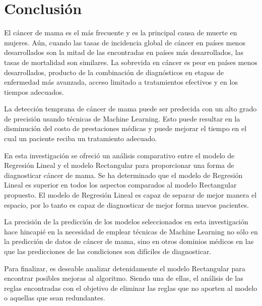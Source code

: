 \documentclass[conference]{IEEEtran}
\begin{document}
\section{Conclusión}
El cáncer de mama es el más frecuente y es la principal causa de muerte en mujeres. Aún, cuando las tasas de incidencia global de cáncer en países menos desarrollados son la mitad de las encontradas en países más desarrollados, las tasas de mortalidad son similares. La sobrevida en cáncer es peor en países menos desarrollados, producto de la combinación de diagnósticos en etapas de enfermedad más avanzada, acceso limitado a tratamientos efectivos y en los tiempos adecuados. \newline

La detección temprana de cáncer de mama puede ser predecida con un alto grado de precisión usando técnicas de Machine Learning. Esto puede resultar en la disminución del costo de prestaciones médicas y puede mejorar el tiempo en el cual un paciente reciba un tratamiento adecuado. \newline

En esta investigación se ofreció un análisis comparativo entre el modelo de Regresión Lineal y el modelo Rectangular para proporcionar una forma de diagnosticar cáncer de mama. Se ha determinado que el modelo de Regresión Lineal es superior en todos los aspectos comparados al modelo Rectangular propuesto. El modelo de Regresión Lineal es capaz de separar de mejor manera el espacio, por lo tanto es capaz de diagnosticar de mejor forma nuevos pacientes. \newline

La precisión de la predicción de los modelos seleccionados en esta investigación hace hincapié en la necesidad de emplear técnicas de Machine Learning no sólo en la predicción de datos de cáncer de mama, sino en otros dominios médicos en las que las predicciones de las condiciones son difíciles de diagnosticar. \newline

Para finalizar, es deseable analizar detenidamente el modelo Rectangular para encontrar posibles mejoras al algoritmo. Siendo una de ellas, el análisis de las reglas encontradas con el objetivo de eliminar las reglas que no aporten al modelo o aquellas que sean redundantes. \newline
\end{document}
